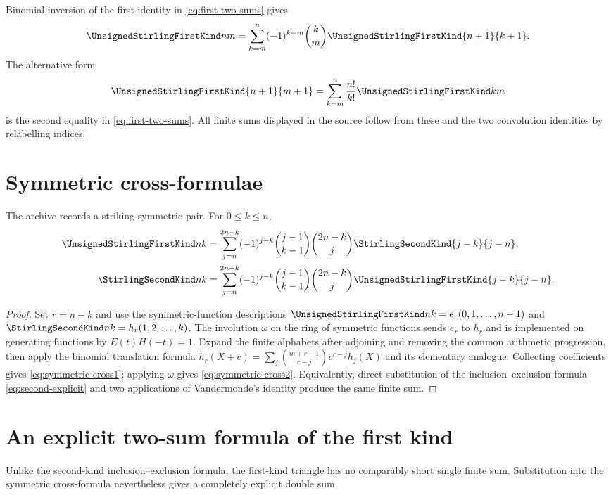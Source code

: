 \documentclass[11pt,a4paper,oneside,openany]{book}
\theoremstyle{definition}
\theoremstyle{remark}
\begin{document}
Binomial inversion of the first identity in \cref{eq:first-two-sums} gives
\begin{equation}\label{eq:first-inverted-sum}
 \UnsignedStirlingFirstKind nm=\sum_{k=m}^n(-1)^{k-m}\binom km\UnsignedStirlingFirstKind{n+1}{k+1}.
\end{equation}
The alternative form
\begin{equation}\label{eq:first-factorial-sum}
 \UnsignedStirlingFirstKind{n+1}{m+1}=\sum_{k=m}^n\frac{n!}{k!}\UnsignedStirlingFirstKind km
\end{equation}
is the second equality in \cref{eq:first-two-sums}.  All finite sums displayed in the
source follow from these and the two convolution identities by relabelling indices.

\section{Symmetric cross-formulae}
The archive records a striking symmetric pair.  For $0\le k\le n$,
\begin{align}
 \UnsignedStirlingFirstKind nk
 &=\sum_{j=n}^{2n-k}(-1)^{j-k}\binom{j-1}{k-1}\binom{2n-k}{j}
      \StirlingSecondKind{j-k}{j-n},\label{eq:symmetric-cross1}\\
 \StirlingSecondKind nk
 &=\sum_{j=n}^{2n-k}(-1)^{j-k}\binom{j-1}{k-1}\binom{2n-k}{j}
      \UnsignedStirlingFirstKind{j-k}{j-n}.\label{eq:symmetric-cross2}
\end{align}
\begin{proof}
Set $r=n-k$ and use the symmetric-function descriptions
$\UnsignedStirlingFirstKind nk=e_r(0,1,\ldots,n-1)$ and
$\StirlingSecondKind nk=h_r(1,2,\ldots,k)$.  The involution $\omega$ on the ring of symmetric
functions sends $e_r$ to $h_r$ and is implemented on generating functions by
$E(t)H(-t)=1$.  Expand the finite alphabets after adjoining and removing the common
arithmetic progression, then apply the binomial translation formula
$h_r(X+c)=\sum_j\binom{m+r-1}{r-j}c^{r-j}h_j(X)$ and its elementary analogue.
Collecting coefficients gives \cref{eq:symmetric-cross1}; applying $\omega$ gives
\cref{eq:symmetric-cross2}.  Equivalently, direct substitution of the
inclusion--exclusion formula \cref{eq:second-explicit} and two applications of
Vandermonde's identity produce the same finite sum.
\end{proof}


\section{An explicit two-sum formula of the first kind}
Unlike the second-kind inclusion--exclusion formula, the first-kind triangle has no
comparably short single finite sum.  Substitution into the symmetric cross-formula
nevertheless gives a completely explicit double sum.
\end{document}
